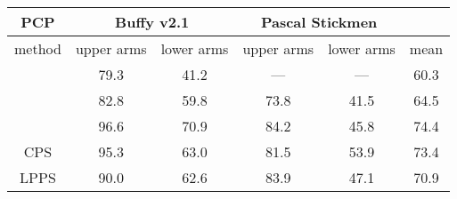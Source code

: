 \begin{tabular}{| c | c | c |c | c | c |}
\hline
PCP & \multicolumn{2}{c|}{Buffy v2.1} & \multicolumn{2}{c|}{Pascal Stickmen} & \\ 
\hline
method & upper arms & lower arms & upper arms & lower arms & mean \\ 
\hline 
\cite{andriluka09} & 79.3 & 41.2 & --- & --- & 60.3\\ 
\cite{eichner09} & 82.8 & 59.8 & 73.8 & 41.5 & 64.5\\ 
\cite{deva2011} & 96.6 & 70.9 & 84.2 & 45.8 & 74.4 \\
CPS & 95.3 & 63.0 & 81.5 & 53.9 & 73.4\\ 
LPPS & 90.0 & 62.6 & 83.9 & 47.1 & 70.9\\ 
\hline 
\end{tabular}
